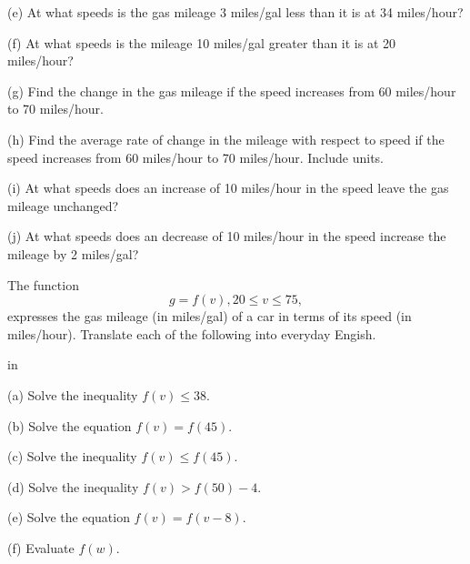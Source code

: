 \documentclass{ximera}
\newcommand{\pskip}{\vskip 0.1 in}
\begin{document}
\begin{example}



\noindent (e) At what speeds is the gas mileage $3$ miles/gal less than it is at 34 miles/hour?




\noindent (f) At what speeds is the mileage 10 miles/gal greater than it is at 20 miles/hour?

\noindent (g) Find the change in the gas mileage if the speed increases from 60 miles/hour to 70 miles/hour.

\noindent (h) Find the average rate of change in the mileage with respect to speed if the speed increases from 60 miles/hour to 70 miles/hour. Include units.

\noindent (i) At what speeds does an increase of 10 miles/hour in the speed leave the gas mileage unchanged?

\noindent (j) At what speeds does an decrease of 10 miles/hour in the speed increase the mileage by 2 miles/gal?

\end{example}


\begin{example}  \label{ExFun25}

The function
\[
   g = f(v) , 20 \leq v \leq 75 ,
\]
expresses the gas mileage (in miles/gal) of a car in terms of its speed (in miles/hour). Translate each of the following into everyday Engish.

\pskip

\noindent (a) Solve the inequality $f(v)\leq 38$.

\noindent (b) Solve the equation $f(v) = f(45)$.

\noindent (c) Solve the inequality $f(v) \leq f(45)$.

\noindent (d) Solve the inequality $f(v)> f(50)-4$.

\noindent (e) Solve the equation $f(v)=f(v-8)$.

\noindent (f) Evaluate $f(w)$.

\end{example}
\end{document}
